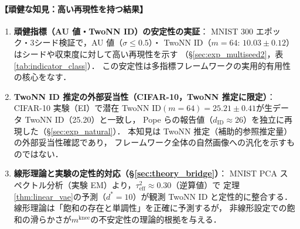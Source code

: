 \documentclass[11pt,a4paper]{jsarticle}
\newcommand{\mknee}{m^{\mathrm{knee}}}
\begin{document}
\paragraph{【頑健な知見：高い再現性を持つ結果】}
\begin{enumerate}
  \item \textbf{頑健指標（AU 値・TwoNN ID）の安定性の実証}：
        MNIST 300 エポック・3シード検証で，AU 値（$\sigma \leq 0.5$）・
        TwoNN ID（$m=64$: $10.03 \pm 0.12$）はシードや収束度に対して高い再現性を示す
        （§\ref{sec:exp_multiseed2}，表\ref{tab:indicator_class}）．
        この安定性は多指標フレームワークの実用的有用性の核心をなす．
  \item \textbf{TwoNN ID 推定の外部妥当性（CIFAR-10，TwoNN 推定に限定）}：
        CIFAR-10 実験（EI）で潜在 TwoNN ID$(m=64)=25.21\pm0.41$が生データ TwoNN ID（25.20）と一致し，
        Pope ら\cite{pope2021intrinsic}の報告値（$d_\mathrm{ID} \approx 26$）を独立に再現した（§\ref{sec:exp_natural}）．
        本知見は TwoNN 推定（補助的参照推定量）の外部妥当性確認であり，
        フレームワーク全体の自然画像への汎化を示すものではない．
  \item \textbf{線形理論と実験の定性的対応（§\ref{sec:theory_bridge}）}：
        MNIST PCA スペクトル分析（実験 EM）より，$\tau^2_\mathrm{eff} \approx 0.30$（逆算値）で
        定理\ref{thm:linear_vae}の予測（$d^*=10$）が観測 TwoNN ID と定性的に整合する．
        線形理論は「飽和の存在と単調性」を正確に予測するが，
        非線形設定での飽和の滑らかさが$\mknee$の不安定性の理論的根拠を与える．
\end{enumerate}
\end{document}
